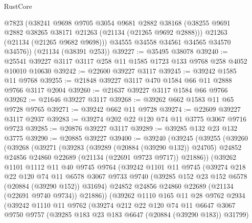 \begin{lexlean}{RustCore}
\begin{coremodule}
        @7823
        (@38241
          @9698
          @9705
          @3054
          @9681
          @2882
          @38168
          (@38255 @9691 @2882 @38265 @38171 @21263 (@21134 (@21265 @9692 @2888)))
          @21263
          (@21134 (@21265 @9682 @9698)))
        @34555
        @34558
        @34561
        @34565
        @34570
        @34576))
    (@21134 (@38391 @253))
@39227 := @35495 @38078
@39240 := @25541 @39227 @3117 @3117 @258 @11 @1585 @1723 @133 @9768 @258 @4052 @10010 @10630
@39242 := @22600 @39227 @3117
@39245 := @39242 @1585 @11 @9768
@39255 := @21848 @39227 @3117 @470 @1584 @66 @11 @2888 @9766 @3117 @2004
@39260 := @21637 @39227 @3117 @1584 @66 @9766
@39262 := @21646 @39227 @3117
@39268 := @39262 @662 @1583 @11 @65 @9728 @9765
@39271 := @39242 @662 @11 @9728
@39274 := @22609 @39227 @3117 @2937
@39283 := @39274 @202 @22 @120 @74 @11 @3775 @3067 @9716 @9723
@39285 := @20876 @39227 @3117
@39289 := @39285 @132 @23 @132 @3775
@39290 := @20885 @39227
@39400 := @39240
    (@39245
      (@39255
        (@39260
          (@39268
            (@39271
              (@39283
                (@39289 (@20884 (@39290 @132)) @24705)
                @24852
                @24856
                @24860
                @22689
                (@21134 (@22691 @9723 @9717))
                @21886))
            (@39262
              @1101
              @1112
              @11
              @40
              @9745
              @9764
              (@39242
                @1101
                @11
                @9745
                (@39274
                  @218
                  @22
                  @120
                  @74
                  @11
                  @6578
                  @3067
                  @9733
                  @9740
                  (@39285 @152 @23 @152 @6578 (@20884 (@39290 @152)) @31694)
                  @24852
                  @24856
                  @24860
                  @22689
                  (@21134 (@22691 @9740 @9734))
                  @21886))
              (@39262
                @1110
                @165
                @11
                @28
                @9762
                @2934
                (@39242
                  @1110
                  @11
                  @9762
                  (@39274
                    @212
                    @22
                    @120
                    @74
                    @11
                    @6647
                    @3067
                    @9750
                    @9757
                    (@39285 @183 @23 @183 @6647 (@20884 (@39290 @183)) @31799)

\end{coremodule}
\end{lexlean}
